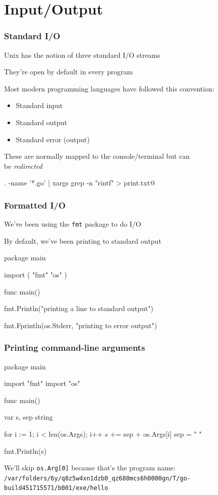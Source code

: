 \documentclass[handout,compress,t,11pt]{beamer}
\begin{document}
\section{Input/Output}
\begin{frame}[fragile]
    \frametitle{Standard I/O}
    Unix has the notion of three standard I/O streams \par
    \vspace{0.5\baselineskip}
    They're open by default in every program \par
    \vspace{0.5\baselineskip}
    Most modern programming languages have followed this convention:
    \begin{itemize}
    \item Standard input
    \item Standard output
    \item Standard error (output)
    \end{itemize}
    \vspace{\baselineskip}
    These are normally mapped to the console/terminal but can \\
    be {\em redirected} \par
    {\scriptsize \verb@find . -name '*.go' | xargs grep -n "rintf" > print.txt@}
\end{frame}

\begin{frame}[fragile]
    \frametitle{Formatted I/O}
    We've been using the \verb|fmt| package to do I/O \par
    \vspace{0.5\baselineskip}
    By default, we've been printing to standard output \par
\begin{golang}
package main

import (
    "fmt"
    "os"
)

func main() {
    fmt.Println("printing a line to standard output")

    fmt.Fprintln(os.Stderr, "printing to error output")
}
\end{golang}
\end{frame}

\begin{frame}[fragile]
\frametitle{Printing command-line arguments}
\begin{golang}
package main

import "fmt"
import "os"

func main() {
    var s, sep string

    for i := 1; i < len(os.Args); i++ {
        s += sep + os.Args[i]
        sep = " "
    }

    fmt.Println(s)
}
\end{golang}
We'll skip \verb|os.Arg[0]| because that's the program name:
{\tiny \verb|/var/folders/6y/q8z5w4xn1dzb0_qz680mcs6h0000gn/T/go-build451715571/b001/exe/hello|}
\end{frame}
\end{document}
